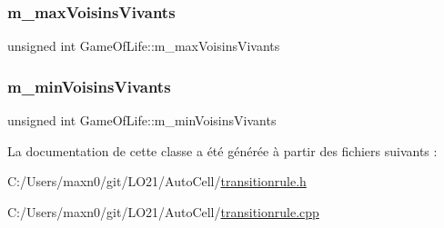 \subsubsection{\texorpdfstring{m\+\_\+max\+Voisins\+Vivants}{m\_maxVoisinsVivants}}
{\footnotesize\ttfamily unsigned int Game\+Of\+Life\+::m\+\_\+max\+Voisins\+Vivants\hspace{0.3cm}{\ttfamily [protected]}}

\mbox{\label{class_game_of_life_a851bf99201f554c12cdedf9fa227c321}} 
\subsubsection{\texorpdfstring{m\+\_\+min\+Voisins\+Vivants}{m\_minVoisinsVivants}}
{\footnotesize\ttfamily unsigned int Game\+Of\+Life\+::m\+\_\+min\+Voisins\+Vivants\hspace{0.3cm}{\ttfamily [protected]}}



La documentation de cette classe a été générée à partir des fichiers suivants \+:\begin{DoxyCompactItemize}
\item 
C\+:/\+Users/maxn0/git/\+L\+O21/\+Auto\+Cell/\mbox{\hyperlink{transitionrule_8h}{transitionrule.\+h}}\item 
C\+:/\+Users/maxn0/git/\+L\+O21/\+Auto\+Cell/\mbox{\hyperlink{transitionrule_8cpp}{transitionrule.\+cpp}}\end{DoxyCompactItemize}
